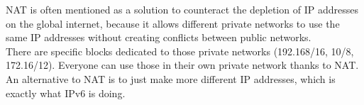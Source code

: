 NAT is often mentioned as a solution to counteract the depletion of IP addresses on the global internet, because it allows different private networks to use the same IP addresses without creating conflicts between public networks. \\
There are specific blocks dedicated to those private networks (192.168/16, 10/8, 172.16/12). Everyone can use those in their own private network thanks to NAT. \\

An alternative to NAT is to just make more different IP addresses, which is exactly what IPv6 is doing.

